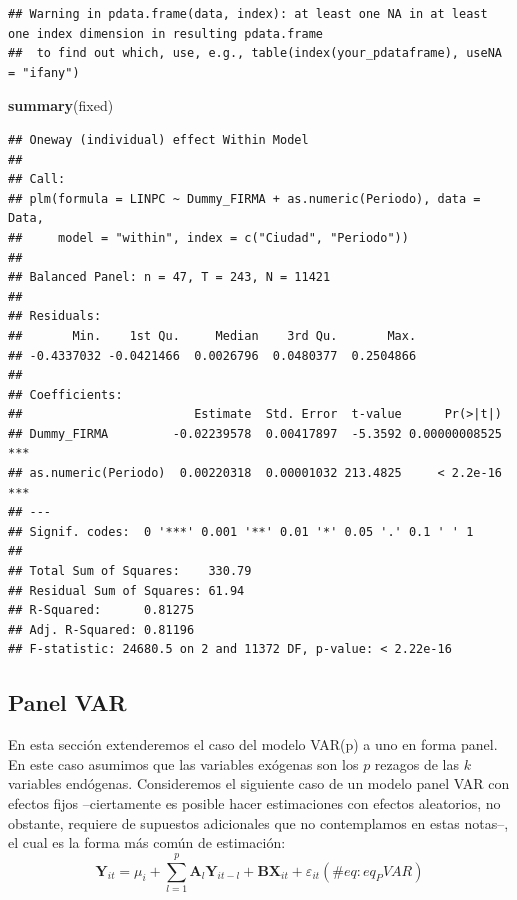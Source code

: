 \documentclass[
]{book}
\newenvironment{Shaded}{\begin{snugshade}}{\end{snugshade}}
\newcommand{\FunctionTok}[1]{\textcolor[rgb]{0.13,0.29,0.53}{\textbf{#1}}}
\newcommand{\NormalTok}[1]{#1}
\begin{document}
\begin{verbatim}
## Warning in pdata.frame(data, index): at least one NA in at least one index dimension in resulting pdata.frame
##  to find out which, use, e.g., table(index(your_pdataframe), useNA = "ifany")
\end{verbatim}

\begin{Shaded}
\begin{Highlighting}[]
\FunctionTok{summary}\NormalTok{(fixed)}
\end{Highlighting}
\end{Shaded}

\begin{verbatim}
## Oneway (individual) effect Within Model
## 
## Call:
## plm(formula = LINPC ~ Dummy_FIRMA + as.numeric(Periodo), data = Data, 
##     model = "within", index = c("Ciudad", "Periodo"))
## 
## Balanced Panel: n = 47, T = 243, N = 11421
## 
## Residuals:
##       Min.    1st Qu.     Median    3rd Qu.       Max. 
## -0.4337032 -0.0421466  0.0026796  0.0480377  0.2504866 
## 
## Coefficients:
##                        Estimate  Std. Error  t-value      Pr(>|t|)    
## Dummy_FIRMA         -0.02239578  0.00417897  -5.3592 0.00000008525 ***
## as.numeric(Periodo)  0.00220318  0.00001032 213.4825     < 2.2e-16 ***
## ---
## Signif. codes:  0 '***' 0.001 '**' 0.01 '*' 0.05 '.' 0.1 ' ' 1
## 
## Total Sum of Squares:    330.79
## Residual Sum of Squares: 61.94
## R-Squared:      0.81275
## Adj. R-Squared: 0.81196
## F-statistic: 24680.5 on 2 and 11372 DF, p-value: < 2.22e-16
\end{verbatim}

\hypertarget{panel-var}{%
\subsection{Panel VAR}\label{panel-var}}

En esta sección extenderemos el caso del modelo VAR(p) a uno en forma panel. En este caso asumimos que las variables exógenas son los \(p\) rezagos de las \(k\) variables endógenas. Consideremos el siguiente caso de un modelo panel VAR con efectos fijos --ciertamente es posible hacer estimaciones con efectos aleatorios, no obstante, requiere de supuestos adicionales que no contemplamos en estas notas--, el cual es la forma más común de estimación:
\begin{equation}
    \mathbf{Y}_{it} = \mu_i + \sum_{l = 1}^p \mathbf{A}_l \mathbf{Y}_{i t - l} + \mathbf{B} \mathbf{X}_{it} + \varepsilon_{it}
   (\#eq:eq_PVAR)
\end{equation}
\end{document}
